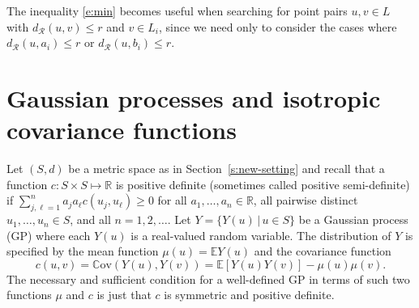 \documentclass[alpha-refs]{wiley-article}
\begin{document}
The inequality \eqref{e:min} becomes useful when searching for point pairs $u,v\in L$ with $d_{\mathcal{R}}(u,v)\le r$ and $v\in L_i$, since we need only to consider the cases where $d_{\mathcal{R}}(u,a_i)\le r$ or $d_{\mathcal{R}}(u,b_i)\le r$.  

\section{Gaussian processes and isotropic covariance functions}\label{s:GP-cov-fct}

Let $(S,d)$ be a metric space as in Section~\ref{s:new-setting} and recall that a function $c:S\times S\mapsto\mathbb R$ is positive definite (sometimes called positive semi-definite) if  $\sum_{j,\ell=1}^n a_j{a_\ell}c(u_j,u_\ell)\ge0$ for all $a_1,\ldots,a_n\in\mathbb R$, all pairwise distinct $u_1,\ldots,u_n\in S$, and all $n=1,2,\ldots$. Let
$Y=\{Y(u)\,|\,u\in S\}$ be a Gaussian process (GP) %
where each $Y(u)$ is a real-valued random variable. The distribution of $Y$ is specified by the mean function $\mu(u)=\mathbb EY(u)$ and the covariance function 
\[c(u,v)=\mathbb C{\mathrm{ov}}(Y(u),Y(v))=\mathbb E[Y(u) %
{Y(v)}]-\mu(u) %
{\mu(v)}.\] 
The necessary and sufficient condition for a well-defined GP in terms of such two functions $\mu$ and $c$ is just that $c$ is symmetric %
and positive definite.


%
\end{document}
